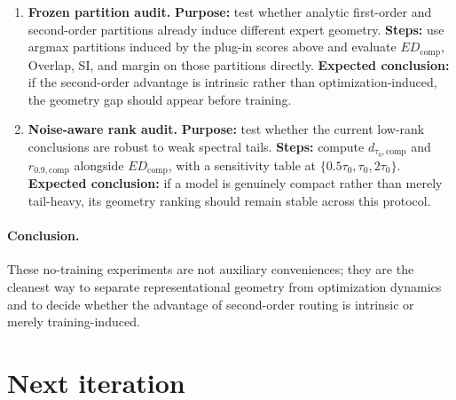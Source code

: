 \documentclass[11pt]{article}
\begin{document}
\begin{enumerate}
    \item \textbf{Frozen partition audit.} \textbf{Purpose:} test whether analytic first-order and second-order partitions already induce different expert geometry. \textbf{Steps:} use argmax partitions induced by the plug-in scores above and evaluate $ED_{\mathrm{comp}}$, Overlap, SI, and margin on those partitions directly. \textbf{Expected conclusion:} if the second-order advantage is intrinsic rather than optimization-induced, the geometry gap should appear before training.
    \item \textbf{Noise-aware rank audit.} \textbf{Purpose:} test whether the current low-rank conclusions are robust to weak spectral tails. \textbf{Steps:} compute $d_{\tau_0,\mathrm{comp}}$ and $r_{0.9,\mathrm{comp}}$ alongside $ED_{\mathrm{comp}}$, with a sensitivity table at $\{0.5\tau_0,\tau_0,2\tau_0\}$. \textbf{Expected conclusion:} if a model is genuinely compact rather than merely tail-heavy, its geometry ranking should remain stable across this protocol.
\end{enumerate}

\paragraph{Conclusion.} These no-training experiments are not auxiliary conveniences; they are the cleanest way to separate representational geometry from optimization dynamics and to decide whether the advantage of second-order routing is intrinsic or merely training-induced.

\section{Next iteration}
\end{document}
